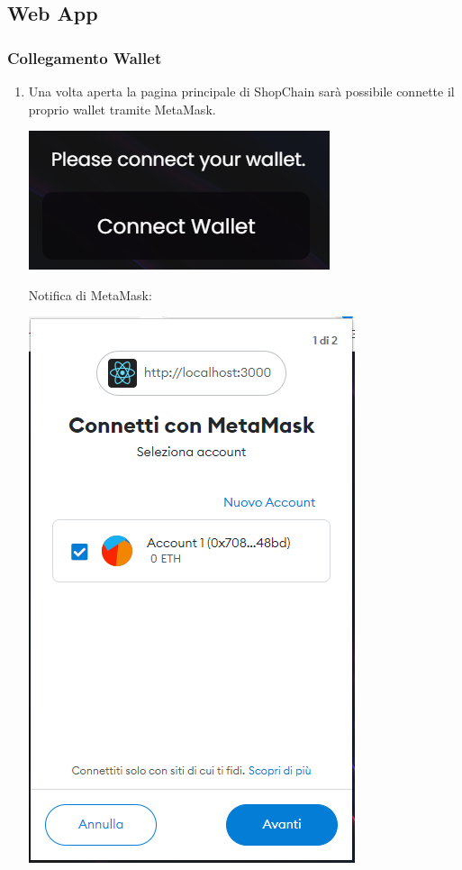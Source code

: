 \subsection{Web App}

\subsubsection{Collegamento Wallet}

\begin{enumerate}
    \item Una volta aperta la pagina principale di ShopChain sarà possibile connette il proprio wallet tramite MetaMask. \\


\begin{center}
\includegraphics[scale = 0.5]{img/Connect.PNG}\\
\end{center}

Notifica di MetaMask:\\
\begin{center}
\includegraphics[scale = 0.4]{img/connessioneAvanti.PNG}\\
\end{center}


\end{enumerate}
